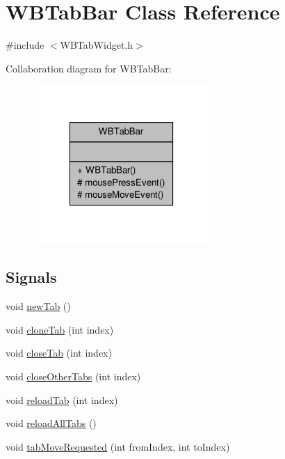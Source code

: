 \hypertarget{class_w_b_tab_bar}{\section{W\-B\-Tab\-Bar Class Reference}
\label{df/d78/class_w_b_tab_bar}
}


{\ttfamily \#include $<$W\-B\-Tab\-Widget.\-h$>$}



Collaboration diagram for W\-B\-Tab\-Bar\-:
\nopagebreak
\begin{figure}[H]
\begin{center}
\leavevmode
\includegraphics[width=190pt]{de/de3/class_w_b_tab_bar__coll__graph}
\end{center}
\end{figure}
\subsection*{Signals}
\begin{DoxyCompactItemize}
\item 
void \hyperlink{class_w_b_tab_bar_a845c426f236cbd3bb419fed27aad66a6}{new\-Tab} ()
\item 
void \hyperlink{class_w_b_tab_bar_acaabb7c80840e36cad8f716d4a865419}{clone\-Tab} (int index)
\item 
void \hyperlink{class_w_b_tab_bar_a96559d2e7ede50a3a99fce8f8b80f362}{close\-Tab} (int index)
\item 
void \hyperlink{class_w_b_tab_bar_af37300f578c8205d5023e249ef9a1b16}{close\-Other\-Tabs} (int index)
\item 
void \hyperlink{class_w_b_tab_bar_af906dd4066f408675f087f126b63c23c}{reload\-Tab} (int index)
\item 
void \hyperlink{class_w_b_tab_bar_aaceefa56d0cdda0cf37a72a61e200057}{reload\-All\-Tabs} ()
\item 
void \hyperlink{class_w_b_tab_bar_a3c083bd648084eca614c6ae9d27d9e0a}{tab\-Move\-Requested} (int from\-Index, int to\-Index)
\end{DoxyCompactItemize}
